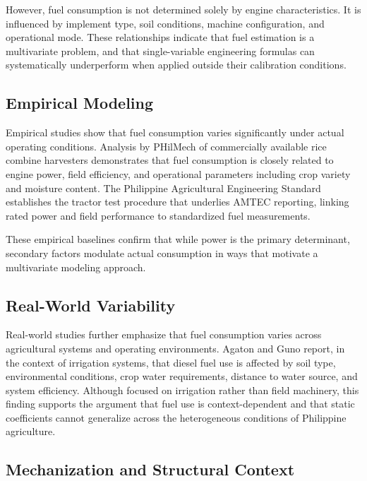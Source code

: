 \documentclass[conference]{IEEEtran}
\begin{document}
However, fuel consumption is not determined solely by engine characteristics. It is influenced by implement type, soil conditions, machine configuration, and operational mode. These relationships indicate that fuel estimation is a multivariate problem, and that single-variable engineering formulas can systematically underperform when applied outside their calibration conditions.

\subsection{Empirical Modeling}

Empirical studies show that fuel consumption varies significantly under actual operating conditions. Analysis by PHilMech \cite{philmech_harvesters} of commercially available rice combine harvesters demonstrates that fuel consumption is closely related to engine power, field efficiency, and operational parameters including crop variety and moisture content. The Philippine Agricultural Engineering Standard \cite{pnspaes148} establishes the tractor test procedure that underlies AMTEC reporting, linking rated power and field performance to standardized fuel measurements.

These empirical baselines confirm that while power is the primary determinant, secondary factors modulate actual consumption in ways that motivate a multivariate modeling approach.

\subsection{Real-World Variability}

Real-world studies further emphasize that fuel consumption varies across agricultural systems and operating environments. Agaton and Guno \cite{agaton2024solar} report, in the context of irrigation systems, that diesel fuel use is affected by soil type, environmental conditions, crop water requirements, distance to water source, and system efficiency. Although focused on irrigation rather than field machinery, this finding supports the argument that fuel use is context-dependent and that static coefficients cannot generalize across the heterogeneous conditions of Philippine agriculture.

\subsection{Mechanization and Structural Context}
\end{document}
